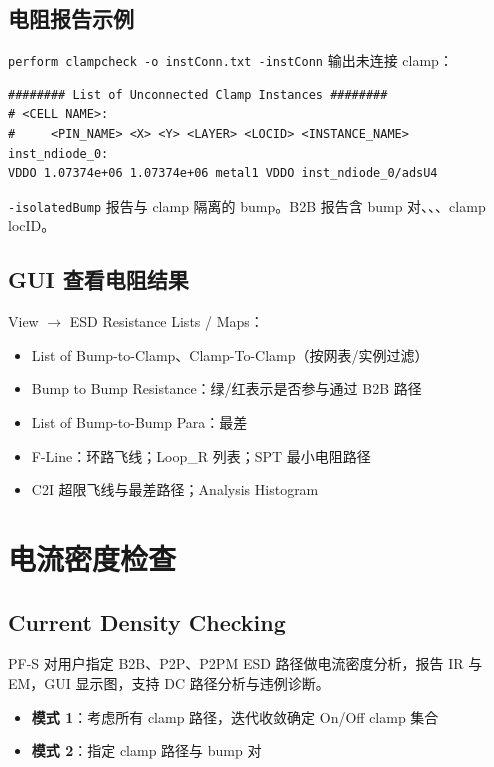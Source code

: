 \subsection{电阻报告示例}
\texttt{perform clampcheck -o instConn.txt -instConn} 输出未连接 clamp：
\begin{lstlisting}
######## List of Unconnected Clamp Instances ########
# <CELL NAME>:
#     <PIN_NAME> <X> <Y> <LAYER> <LOCID> <INSTANCE_NAME>
inst_ndiode_0:
VDDO 1.07374e+06 1.07374e+06 metal1 VDDO inst_ndiode_0/adsU4
\end{lstlisting}

\texttt{-isolatedBump} 报告与 clamp 隔离的 bump。B2B 报告含 bump 对、、、clamp locID。

\subsection{GUI 查看电阻结果}
View $\rightarrow$ ESD Resistance Lists / Maps：
\begin{itemize}
  \item List of Bump-to-Clamp、Clamp-To-Clamp（按网表/实例过滤）
  \item Bump to Bump Resistance：绿/红表示是否参与通过 B2B 路径
  \item List of Bump-to-Bump Para：最差 
  \item F-Line：环路飞线；Loop\_R 列表；SPT 最小电阻路径
  \item C2I 超限飞线与最差路径；Analysis Histogram
\end{itemize}


\section{电流密度检查}
\subsection*{Current Density Checking}

PF-S 对用户指定 B2B、P2P、P2PM ESD 路径做电流密度分析，报告 IR 与 EM，GUI 显示图，支持 DC 路径分析与违例诊断。

\begin{itemize}
  \item \textbf{模式 1}：考虑所有 clamp 路径，迭代收敛确定 On/Off clamp 集合
  \item \textbf{模式 2}：指定 clamp 路径与 bump 对
\end{itemize}

